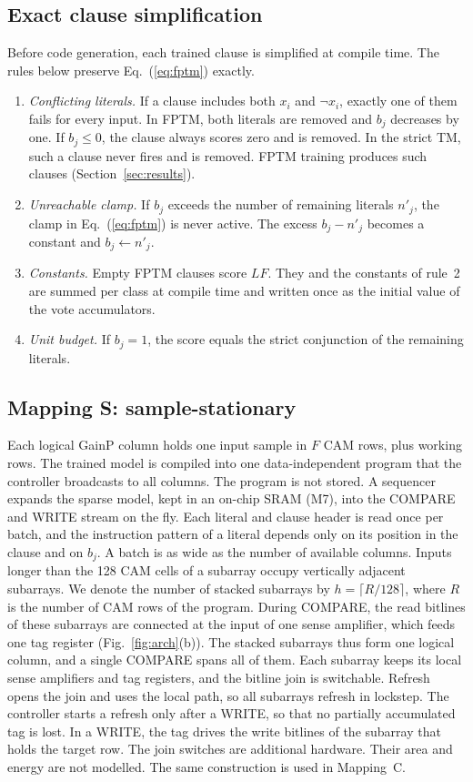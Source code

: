 \documentclass[preprint,review,12pt]{elsarticle}
\newcommand{\gainp}{GainP}
\newcommand{\hyp}[1]{#1}   %
\newcommand{\LF}{\mathit{LF}}
\begin{document}
\subsection{Exact clause simplification}\label{sec:norm}
Before code generation, each trained clause is simplified at compile time.
The rules below preserve Eq.~(\ref{eq:fptm}) exactly.
\begin{enumerate}
\item \emph{Conflicting literals.} If a clause includes both $x_i$ and $\lnot x_i$, exactly one of them fails for every input.
In FPTM, both literals are removed and $b_j$ decreases by one. If $b_j\le0$, the clause always scores zero and is removed.
In the strict TM, such a clause never fires and is removed.
FPTM training produces such clauses (Section~\ref{sec:results}).
\item \emph{Unreachable clamp.} If $b_j$ exceeds the number of remaining literals $n'_j$, the clamp in Eq.~(\ref{eq:fptm}) is never active. The excess $b_j-n'_j$ becomes a constant and $b_j\leftarrow n'_j$.
\item \emph{Constants.} Empty FPTM clauses score $\LF$. They and the constants of rule~2 are summed per class at compile time and written once as the initial value of the vote accumulators.
\item \emph{Unit budget.} If $b_j=1$, the score equals the strict conjunction of the remaining literals.
\end{enumerate}

\subsection{Mapping S: sample-stationary}\label{sec:mapS}
Each logical \gainp{} column holds one input sample in $F$ CAM rows, plus working rows.
The trained model is compiled into one data-independent program that the controller broadcasts to all columns.
\hyp{The program is not stored. A sequencer expands the sparse model, kept in an on-chip SRAM (M7), into the COMPARE and WRITE stream on the fly. Each literal and clause header is read once per batch, and the instruction pattern of a literal depends only on its position in the clause and on $b_j$.}
A batch is as wide as the number of available columns.
Inputs longer than the 128 CAM cells of a subarray occupy vertically adjacent subarrays.
We denote the number of stacked subarrays by $h=\lceil R/128\rceil$, where $R$ is the number of CAM rows of the program.
During COMPARE, the read bitlines of these subarrays are connected at the input of one sense amplifier, which feeds one tag register (Fig.~\ref{fig:arch}(b)).
The stacked subarrays thus form one logical column, and a single COMPARE spans all of them.
\hyp{Each subarray keeps its local sense amplifiers and tag registers, and the bitline join is switchable. Refresh opens the join and uses the local path, so all subarrays refresh in lockstep. The controller starts a refresh only after a WRITE, so that no partially accumulated tag is lost. In a WRITE, the tag drives the write bitlines of the subarray that holds the target row. The join switches are additional hardware. Their area and energy are not modelled.}
The same construction is used in Mapping~C.
\end{document}
